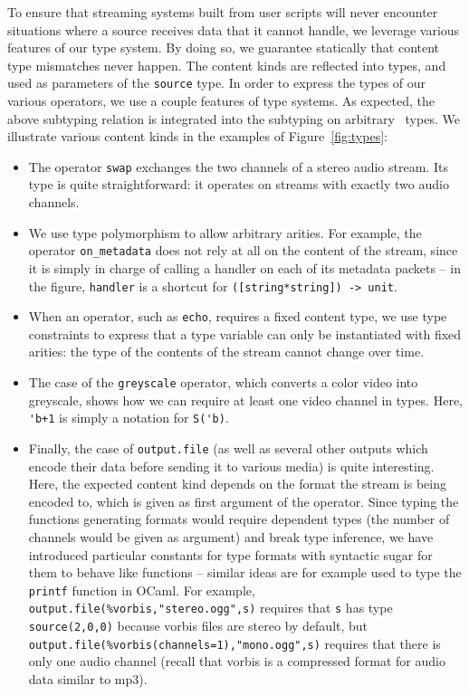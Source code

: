 To ensure that streaming systems built from user scripts will never
encounter situations where a source receives data that it cannot handle,
we leverage various features of our type system.
By doing so, we guarantee statically that content type mismatches never happen.
The content kinds are reflected into types,
and used as parameters of the \texttt{source} type.
In order to express the types of our various operators,
we use a couple features of type systems.
As expected, the above subtyping relation is integrated into
the subtyping on arbitrary \liquidsoap\ types.
We illustrate various content kinds in the examples of Figure~\ref{fig:types}:
\begin{itemize}
\item The operator \texttt{swap} exchanges the two channels of a stereo audio
  stream. Its type is quite straightforward: it operates on streams with exactly
  two audio channels.
\item
  We use type polymorphism to allow arbitrary arities.
  For example, the operator \verb.on_metadata. does not rely
  at all on the content of the stream, since it is simply in
  charge of calling a handler on each of its metadata packets --
  in the figure, \verb.handler. is a shortcut for
  \verb.([string*string]) -> unit..
\item When an operator, such as \verb.echo., requires a fixed content type, we
  use type constraints to express that a type variable can only be instantiated
  with fixed arities: the type of the contents of the stream cannot change over
  time.
\item The case of the \texttt{greyscale} operator, which converts a color
  video into greyscale, shows how we can require at least one video channel in
  types.  Here, \verb.'b+1. is simply a notation for \verb.S('b)..
\item Finally, the case of \verb#output.file# (as well as several other outputs
  which encode their data before sending it to various media) is quite
  interesting. Here, the expected content kind depends on the format the stream
  is being encoded to, which is given as first argument of the operator. Since
  typing the functions generating formats would require dependent types (the
  number of channels would be given as argument) and break type inference, we
  have introduced particular constants for type formats with syntactic sugar for
  them to behave like functions -- similar ideas are for example used to type
  the \texttt{printf} function in OCaml. For example,
  \verb$output.file(%vorbis,"stereo.ogg",s)$ requires that
  \verb.s. has type \verb.source(2,0,0). because vorbis files are stereo by
  default, but \verb$output.file(%vorbis(channels=1),"mono.ogg",s)$
  requires that there is only one audio channel (recall that vorbis is a
  compressed format for audio data similar to mp3).
\end{itemize}

